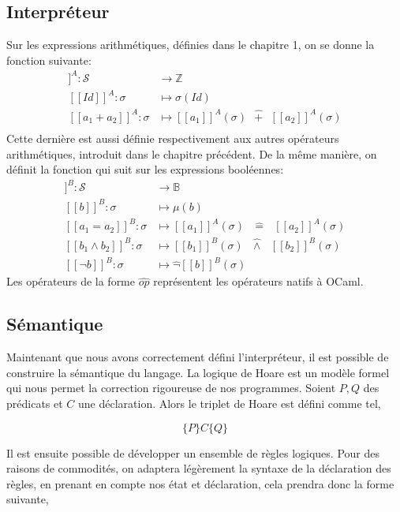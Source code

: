 \documentclass[a4paper, 12pt]{article}
\begin{document}
\subsection{Interpréteur}
Sur les expressions arithmétiques, définies dans le chapitre 1, on se donne la fonction suivante:
\begin{align*}
	[\![Exp_a]\!]^A : \mathcal{S} &\longrightarrow \mathbb{Z}\\
	[\![Id]\!]^A : \sigma &\longmapsto \sigma(Id)\\
	[\![a_1+a_2]\!]^A : \sigma &\longmapsto [\![a_1]\!]^A(\sigma)\text{ }\hat{+}\text{ }[\![a_2]\!]^A(\sigma)\\
\end{align*}
Cette dernière est aussi définie respectivement aux autres opérateurs arithmétiques, introduit dans le chapitre précédent.
De la même manière, on définit la fonction qui suit sur les expressions booléennes:
\begin{align*}
	[\![Exp_b]\!]^{B} : \mathcal{S} &\longrightarrow \mathbb{B}\\	
	[\![b]\!]^{B} : \sigma &\longmapsto \mu(b)\\
	[\![a_1 = a_2]\!]^B : \sigma &\longmapsto [\![a_1]\!]^{A}(\sigma)\text{ }\hat{=}\text{ }[\![a_2]\!]^A(\sigma)\\
	[\![b_1 \wedge b_2]\!]^B : \sigma &\longmapsto [\![b_1]\!]^B(\sigma)\text{ }\hat{\wedge}\text{ }[\![b_2]\!]^B(\sigma)\\
	[\![\neg b]\!]^B : \sigma &\longmapsto \hat{\neg}[\![b]\!]^B(\sigma)
\end{align*}
Les opérateurs de la forme $\hat{op}$ représentent les opérateurs natifs à OCaml.

\subsection{Sémantique}
Maintenant que nous avons correctement défini l'interpréteur, il est possible de construire la sémantique du langage.
La logique de Hoare est un modèle formel qui nous permet la correction rigoureuse de nos programmes. Soient $P, Q$ des 
prédicats et $C$ une déclaration. Alors le triplet de Hoare est défini comme tel,

$$\{P\}C\{Q\}$$

Il est ensuite possible de développer un ensemble de règles logiques. Pour des raisons de commodités, on adaptera légèrement 
la syntaxe de la déclaration des règles, en prenant en compte nos état et déclaration, cela prendra donc la forme suivante,
\end{document}

